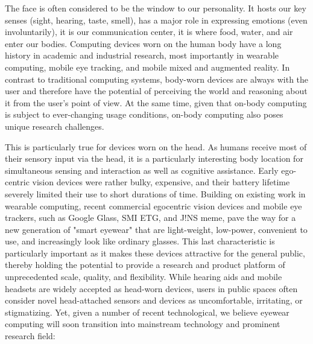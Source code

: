 \documentclass{sigchi-ext}
\begin{document}
The face is often considered to be the window to our personality. It hosts our key senses (sight, hearing, taste, smell), has a major role in expressing emotions (even involuntarily), it is our communication center, it is where food, water, and air enter our bodies.  
Computing devices worn on the human body have a long history in academic and industrial research, most importantly in wearable computing, mobile eye tracking, and mobile mixed and augmented reality.  In contrast to traditional computing systems, body-worn devices are always with the user and therefore have the potential of perceiving the world and reasoning about it from the user's point of view. At the same time, given that on-body computing is subject to ever-changing usage conditions, on-body computing also poses unique research challenges. 

This is particularly true for devices worn on the head. As humans receive most of their sensory input via the head, it is a particularly interesting body location for simultaneous sensing and interaction as well as cognitive assistance. Early ego- centric vision devices were rather bulky, expensive, and their battery lifetime severely limited their use to short durations of time\cite{cakmakci2006head}. Building on existing work in wearable computing, recent commercial egocentric vision devices and mobile eye trackers, such as Google Glass, SMI ETG, and J!NS meme, pave the way for a new generation of "smart eyewear" that are light-weight, low-power, convenient to use, and increasingly look like ordinary glasses\cite{bulling2014cognition,kliegl2006tracking}. This last characteristic is particularly important as it makes these devices attractive for the general public, thereby holding the potential to provide a research and product platform of unprecedented scale, quality, and flexibility.
While hearing aids and mobile headsets are widely accepted as head-worn devices, users in public spaces often consider novel head-attached sensors and devices as uncomfortable, irritating, or stigmatizing. Yet, given a number of recent technological, we believe eyewear computing will soon transition into mainstream technology and prominent research field:
\end{document}
